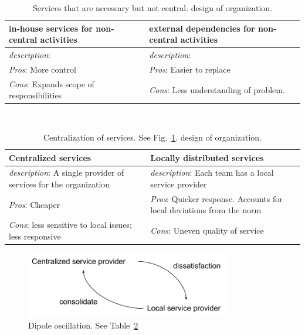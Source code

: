 \begin{center}
\begin{table}[ht]
\begin{tabular}{ | m{\dilemmatablewidth}| m{\dilemmatablewidth} | } 
  \hline
  \textbf{in-house services for non-central activities } &
  \textbf{external dependencies for non-central activities} \\
  \hline
  \textit{description}:  &
  \textit{description}:  \\  
  \hline
  \textit{Pros}: More control &
  \textit{Pros}: Easier to replace \\
  \hline
  \textit{Cons}: Expands scope of responsibilities & 
  \textit{Cons}: Less understanding of problem.  \\
  \hline
\end{tabular}
\caption{Services that are necessary but not central.
{\tiny design of organization.}
}
\label{table:inhouse-vs-external}
\end{table}
\end{center}

\ \\

\begin{center}
\begin{table}[ht]
\begin{tabular}{ | m{\dilemmatablewidth}| m{\dilemmatablewidth} | } 
  \hline
  \textbf{Centralized services} &
  \textbf{Locally distributed services} \\
  \hline
  \textit{description}: A single provider of services for the organization &
  \textit{description}: Each team has a local service provider \\  
  \hline
  \textit{Pros}: Cheaper &
  \textit{Pros}: Quicker response. Accounts for local deviations from the norm \\
  \hline
  \textit{Cons}: less sensitive to local issues; less responsive & 
  \textit{Cons}: Uneven quality of service \\
  \hline
\end{tabular}
\caption{Centralization of services. See Fig.~\ref{fig:central-vs-distributed}.
{\tiny design of organization.}
}
\label{table:central-vs-distributed}
\end{table}
\end{center}

\begin{figure}[ht]
    \centering
    \includegraphics[width=0.8\textwidth]{images/dilemma_centralization-vs-distributed.pdf}
    \caption{Dipole oscillation. See Table~\ref{table:central-vs-distributed}}
    \label{fig:central-vs-distributed}
\end{figure}

